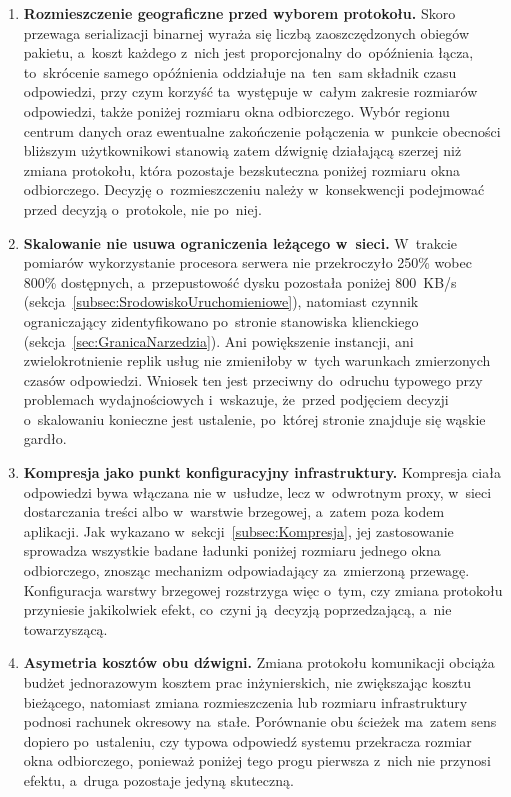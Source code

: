 \begin{enumerate}
\item \textbf{Rozmieszczenie geograficzne przed wyborem protokołu.} Skoro przewaga serializacji binarnej wyraża się liczbą zaoszczędzonych obiegów pakietu, a~koszt każdego z~nich jest proporcjonalny do~opóźnienia łącza, to~skrócenie samego opóźnienia oddziałuje na~ten~sam składnik czasu odpowiedzi, przy czym korzyść ta~występuje w~całym zakresie rozmiarów odpowiedzi, także poniżej rozmiaru okna odbiorczego. Wybór regionu centrum danych oraz ewentualne zakończenie połączenia w~punkcie obecności bliższym użytkownikowi stanowią zatem dźwignię działającą szerzej niż zmiana protokołu, która pozostaje bezskuteczna poniżej rozmiaru okna odbiorczego. Decyzję o~rozmieszczeniu należy w~konsekwencji podejmować przed decyzją o~protokole, nie po~niej.

\item \textbf{Skalowanie nie usuwa ograniczenia leżącego w~sieci.} W~trakcie pomiarów wykorzystanie procesora serwera nie przekroczyło 250\% wobec 800\% dostępnych, a~przepustowość dysku pozostała poniżej 800~KB/s (sekcja~\ref{subsec:SrodowiskoUruchomieniowe}), natomiast czynnik ograniczający zidentyfikowano po~stronie stanowiska klienckiego (sekcja~\ref{sec:GranicaNarzedzia}). Ani powiększenie instancji, ani zwielokrotnienie replik usług nie zmieniłoby w~tych warunkach zmierzonych czasów odpowiedzi. Wniosek ten jest przeciwny do~odruchu typowego przy problemach wydajnościowych i~wskazuje, że~przed podjęciem decyzji o~skalowaniu konieczne jest ustalenie, po~której stronie znajduje się wąskie gardło.

\item \textbf{Kompresja jako punkt konfiguracyjny infrastruktury.} Kompresja ciała odpowiedzi bywa włączana nie w~usłudze, lecz w~odwrotnym proxy, w~sieci dostarczania treści albo w~warstwie brzegowej, a~zatem poza kodem aplikacji. Jak wykazano w~sekcji~\ref{subsec:Kompresja}, jej zastosowanie sprowadza wszystkie badane ładunki poniżej rozmiaru jednego okna odbiorczego, znosząc mechanizm odpowiadający za~zmierzoną przewagę. Konfiguracja warstwy brzegowej rozstrzyga więc o~tym, czy zmiana protokołu przyniesie jakikolwiek efekt, co~czyni ją~decyzją poprzedzającą, a~nie towarzyszącą.

\item \textbf{Asymetria kosztów obu dźwigni.} Zmiana protokołu komunikacji obciąża budżet jednorazowym kosztem prac inżynierskich, nie zwiększając kosztu bieżącego, natomiast zmiana rozmieszczenia lub rozmiaru infrastruktury podnosi rachunek okresowy na~stałe. Porównanie obu ścieżek ma~zatem sens dopiero po~ustaleniu, czy typowa odpowiedź systemu przekracza rozmiar okna odbiorczego, ponieważ poniżej tego progu pierwsza z~nich nie przynosi efektu, a~druga pozostaje jedyną skuteczną.
\end{enumerate}

